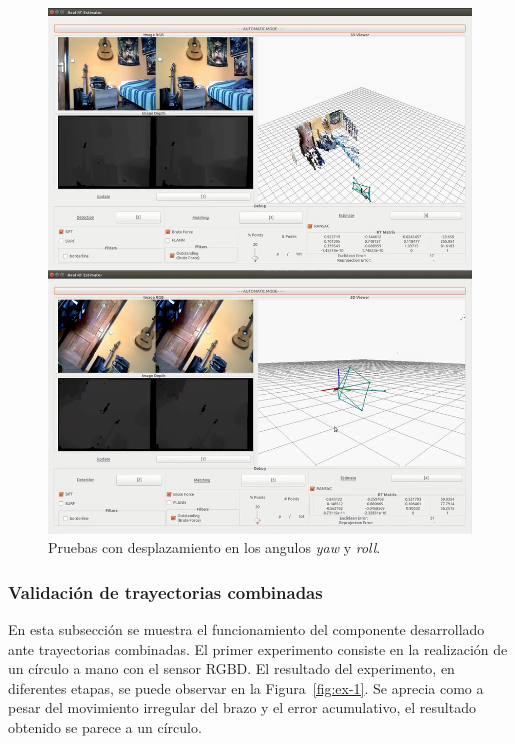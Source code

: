 \begin{figure}[th]
\centering
\includegraphics[scale=0.35]{Figures/tests/yaw-roll.png}
\decoRule
\caption[Pruebas con desplazamiento en los angulos \textit{yaw} y \textit{roll}]{Pruebas con desplazamiento en los angulos \textit{yaw} y \textit{roll}.}
\label{fig:yaw-roll}
\end{figure}

\subsubsection{Validación de trayectorias combinadas}

En esta subsección se muestra el funcionamiento del componente desarrollado ante trayectorias combinadas. El primer experimento consiste en la realización de un círculo a mano con el sensor RGBD. El resultado del experimento, en diferentes etapas, se puede observar en la Figura~\ref{fig:ex-1}. Se aprecia como a pesar del movimiento irregular del brazo y el error acumulativo, el resultado obtenido se parece a un círculo.

